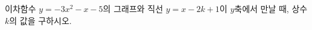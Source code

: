\hspace*{2mm}\begin{minipage}[t]{\dimexpr\linewidth-2mm\relax}\vspace{0pt}
이차함수 $y=-3x^2-x-5$의 그래프와 직선 $y=x-2k+1$이 $y$축에서 만날 때, 상수 $k$의 값을 구하시오.\end{minipage}
